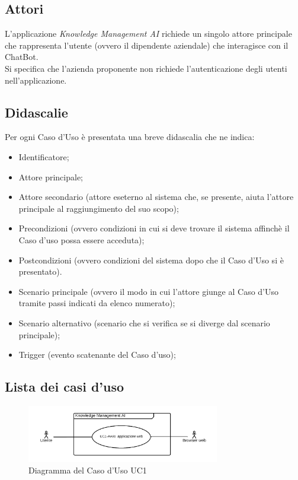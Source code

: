 \documentclass[10pt, a4paper]{article}
\begin{document}
\subsection{Attori}
L'applicazione \textit{Knowledge Management AI} richiede un singolo attore principale che rappresenta l'utente (ovvero il dipendente aziendale) che interagisce con il ChatBot. \\ Si specifica che l'azienda proponente non richiede l'autenticazione degli utenti nell'applicazione.%
\subsection{Didascalie}
Per ogni Caso d'Uso è presentata una breve didascalia che ne indica:
\begin{itemize}
    \item Identificatore;
    \item Attore principale;
    \item Attore secondario (attore eseterno al sistema che, se presente, aiuta l'attore principale al raggiungimento del suo scopo);
    \item Precondizioni (ovvero condizioni in cui si deve trovare il sistema affinchè il Caso d'uso possa essere acceduta);
    \item Postcondizioni (ovvero condizioni del sistema dopo che il Caso d'Uso si è presentato).
    \item Scenario principale (ovvero il modo in cui l'attore giunge al Caso d'Uso tramite passi indicati da elenco numerato);
    \item Scenario alternativo (scenario che si verifica se si diverge dal scenario principale);
    \item Trigger (evento scatenante del Caso d'uso);  
    \end{itemize}
\newpage
\subsection{Lista dei casi d'uso}

    \begin{figure}[h]
        \centering
        \includegraphics[width=0.75\textwidth, height=0.75\textheight, keepaspectratio]{UC-images/UC1.png}
        \caption{Diagramma del Caso d'Uso UC1}
    \end{figure}
    
\end{document}
